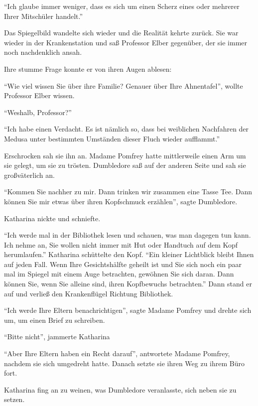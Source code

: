 \enquote{Ich glaube immer weniger, dass es sich um einen Scherz eines oder mehrerer Ihrer Mitschüler handelt.}

Das Spiegelbild wandelte sich wieder und die Realität kehrte zurück. Sie war wieder in der Krankenstation und saß Professor Elber gegenüber, der sie immer noch nachdenklich ansah.

Ihre stumme Frage konnte er von ihren Augen ablesen: 

\enquote{Wie viel wissen Sie über ihre Familie? Genauer über Ihre Ahnentafel}, wollte Professor Elber wissen.

\enquote{Weshalb, Professor?}

\enquote{Ich habe einen Verdacht. Es ist nämlich so, dass bei weiblichen Nachfahren der Medusa unter bestimmten Umständen dieser Fluch wieder aufflammt.}

Erschrocken sah sie ihn an. Madame Pomfrey hatte mittlerweile einen Arm um sie gelegt, um sie zu trösten. Dumbledore saß auf der anderen Seite und sah sie großväterlich an.

\enquote{Kommen Sie nachher zu mir. Dann trinken wir zusammen eine Tasse Tee. Dann können Sie mir etwas über ihren Kopfschmuck erzählen}, sagte Dumbledore.

Katharina nickte und schniefte.

\enquote{Ich werde mal in der Bibliothek lesen und schauen, was man dagegen tun kann. Ich nehme an, Sie wollen nicht immer mit Hut oder Handtuch auf dem Kopf herumlaufen.} Katharina schüttelte den Kopf. \enquote{Ein kleiner Lichtblick bleibt Ihnen auf jeden Fall. Wenn Ihre Gesichtshälfte geheilt ist und Sie sich noch ein paar mal im Spiegel mit einem Auge betrachten, gewöhnen Sie sich daran. Dann können Sie, wenn Sie alleine sind, ihren Kopfbewuchs betrachten.} Dann stand er auf und verließ den Krankenflügel Richtung Bibliothek.

\enquote{Ich werde Ihre Eltern benachrichtigen}, sagte Madame Pomfrey und drehte sich um, um einen Brief zu schreiben.

\enquote{Bitte nicht}, jammerte Katharina

\enquote{Aber Ihre Eltern haben ein Recht darauf}, antwortete Madame Pomfrey, nachdem sie sich umgedreht hatte. Danach setzte sie ihren Weg zu ihrem Büro fort.

Katharina fing an zu weinen, was Dumbledore veranlasste, sich neben sie zu setzen.


